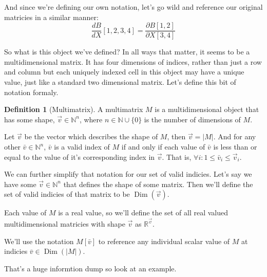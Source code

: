 \documentclass[12pt]{book}
\theoremstyle{plain}
\theoremstyle{definition}
\newtheorem{definition}{Definition}[chapter]
\theoremstyle{ppart}
\theoremstyle{case}
\theoremstyle{solution}
\DeclareMathOperator{\Dim}{Dim}
\newcommand{\shape}[1]{\left|#1\right|}
\begin{document}
And since we're defining our own notation, let's go wild and reference our original
matricies in a similar manner:
\[
\frac{dB}{dX}[1,2,3,4] = \frac{\partial B[1,2]}{\partial X[3,4]}
\]

So what is this object we've defined? In all ways that matter, it seems to be
a multidimensional matrix. It has four dimensions of indices, rather than just
a row and column but each uniquely indexed cell in this object may have a
unique value, just like a standard two dimensional matrix. Let's define this
bit of notation formaly.

\begin{definition}[Multimatrix]
A multimatrix $M$ is a multidimensional object that has some shape,
$\vec{v} \in \mathbb{N}^n$, where $n \in \mathbb{N} \cup \{0\}$
is the number of dimensions of $M$.

Let $\vec{v}$ be the vector which describes the shape of
$M$, then $\vec{v} = \shape{M}$. And for any other $\bar{v} \in \mathbb{N}^n$, $\bar{v}$
is a valid index of $M$ if and only if each value of $\bar{v}$ is less than or equal
to the value of it's corresponding index in $\vec{v}$.
That is, $\forall i: 1 \le \bar{v}_i \le \vec{v}_i$.

We can further simplify that notation for our set of valid indicies. Let's say we have
some $\vec{v} \in \mathbb{N}^n$ that defines the shape of some matrix. Then we'll
define the set of valid indicies of that matrix to be $\Dim(\vec{v})$. 

Each value of $M$ is a real value, so we'll define the set of all real valued
multidimensional matricies with shape $\vec{v}$ as $\mathbb{R}^{\vec{v}}$.

We'll use the notation $M[\bar{v}]$ to reference any individual scalar value of $M$
at indicies $\bar{v} \in \Dim(\shape{M})$. 
\end{definition}

That's a huge informtion dump so look at an example.
\end{document}
